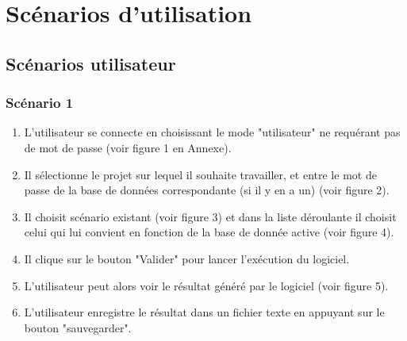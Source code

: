 \documentclass[12pt]{report}
\begin{document}
\section{Scénarios d'utilisation}

\subsection{Scénarios utilisateur}

\subsubsection{Scénario 1}
	\begin{enumerate}
	\item L'utilisateur se connecte en choisissant le mode "utilisateur" ne requérant pas de mot de passe (voir figure 1 en Annexe).
			\item Il sélectionne le projet sur lequel il souhaite travailler, et entre le mot de passe de la base de données correspondante (si il y en a un) (voir figure 2).
            \item Il choisit scénario existant (voir figure 3) et dans la liste déroulante il choisit celui qui lui convient en fonction de la base de donnée active (voir figure 4).
            \item Il clique sur le bouton "Valider" pour lancer l'exécution du logiciel.
            \item L'utilisateur peut alors voir le résultat généré par le logiciel (voir figure 5).
            \item L'utilisateur enregistre le résultat dans un fichier texte en appuyant sur le bouton "sauvegarder".
            \end{enumerate}
\end{document}
